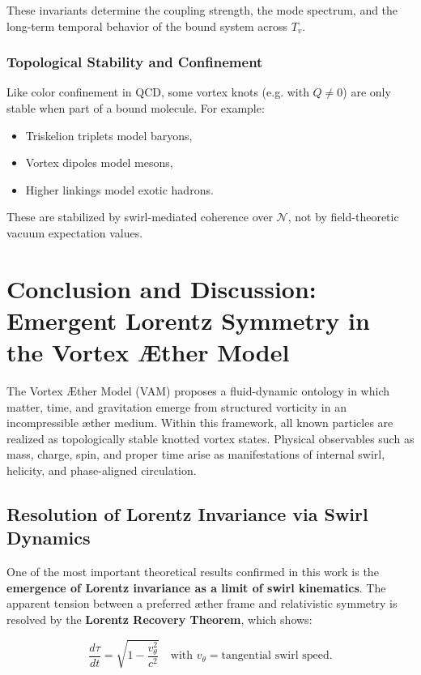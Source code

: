 \documentclass[12pt]{article}
\begin{document}
These invariants determine the coupling strength, the mode spectrum, and the long-term temporal behavior of the bound system across \( T_v \).

\subsubsection*{Topological Stability and Confinement}

Like color confinement in QCD, some vortex knots (e.g. with \( Q \neq 0 \)) are only stable when part of a bound molecule. For example:
\begin{itemize}
  \item Triskelion triplets model baryons,
  \item Vortex dipoles model mesons,
  \item Higher linkings model exotic hadrons.
\end{itemize}

These are stabilized by swirl-mediated coherence over \( \mathcal{N} \), not by field-theoretic vacuum expectation values.


\section{Conclusion and Discussion: Emergent Lorentz Symmetry in the Vortex Æther Model}

The Vortex \AE{}ther Model (VAM) proposes a fluid-dynamic ontology in which matter, time, and gravitation emerge from structured vorticity in an incompressible æther medium. Within this framework, all known particles are realized as topologically stable knotted vortex states. Physical observables such as mass, charge, spin, and proper time arise as manifestations of internal swirl, helicity, and phase-aligned circulation.

\subsection*{Resolution of Lorentz Invariance via Swirl Dynamics}

One of the most important theoretical results confirmed in this work is the \textbf{emergence of Lorentz invariance as a limit of swirl kinematics}. The apparent tension between a preferred æther frame and relativistic symmetry is resolved by the \textbf{Lorentz Recovery Theorem}, which shows:

\[
\frac{d\tau}{dt} = \sqrt{1 - \frac{v_\theta^2}{c^2}} \quad \text{with } v_\theta = \text{tangential swirl speed}.
\]
\end{document}
